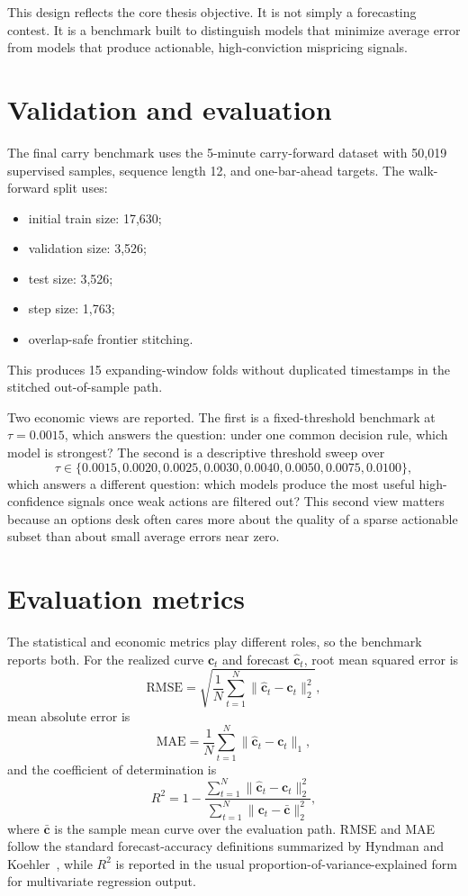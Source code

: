 \documentclass[12pt]{report}
\begin{document}
This design reflects the core thesis objective. It is not simply a forecasting contest. It is a benchmark built to distinguish models that minimize average error from models that produce actionable, high-conviction mispricing signals.


\section{Validation and evaluation}
The final carry benchmark uses the 5-minute carry-forward dataset with 50,019 supervised samples, sequence length 12, and one-bar-ahead targets. The walk-forward split uses:
\begin{itemize}[leftmargin=1.2cm]
    \item initial train size: 17,630;
    \item validation size: 3,526;
    \item test size: 3,526;
    \item step size: 1,763;
    \item overlap-safe frontier stitching.
\end{itemize}
This produces 15 expanding-window folds without duplicated timestamps in the stitched out-of-sample path.

Two economic views are reported. The first is a fixed-threshold benchmark at \(\tau=0.0015\), which answers the question: under one common decision rule, which model is strongest? The second is a descriptive threshold sweep over
\[
\tau \in \{0.0015,0.0020,0.0025,0.0030,0.0040,0.0050,0.0075,0.0100\},
\]
which answers a different question: which models produce the most useful high-confidence signals once weak actions are filtered out? This second view matters because an options desk often cares more about the quality of a sparse actionable subset than about small average errors near zero.

\section{Evaluation metrics}
The statistical and economic metrics play different roles, so the benchmark reports both. For the realized curve \(\mathbf{c}_t\) and forecast \(\hat{\mathbf{c}}_t\), root mean squared error is
\[
\mathrm{RMSE}=\sqrt{\frac{1}{N}\sum_{t=1}^{N}\lVert \hat{\mathbf{c}}_t-\mathbf{c}_t\rVert_2^2},
\]
mean absolute error is
\[
\mathrm{MAE}=\frac{1}{N}\sum_{t=1}^{N}\lVert \hat{\mathbf{c}}_t-\mathbf{c}_t\rVert_1,
\]
and the coefficient of determination is
\[
R^2 = 1 - \frac{\sum_{t=1}^{N}\lVert \hat{\mathbf{c}}_t-\mathbf{c}_t\rVert_2^2}{\sum_{t=1}^{N}\lVert \mathbf{c}_t-\bar{\mathbf{c}}\rVert_2^2},
\]
where \(\bar{\mathbf{c}}\) is the sample mean curve over the evaluation path. RMSE and MAE follow the standard forecast-accuracy definitions summarized by Hyndman and Koehler~\citep{hyndman2006}, while \(R^2\) is reported in the usual proportion-of-variance-explained form for multivariate regression output.
\end{document}
